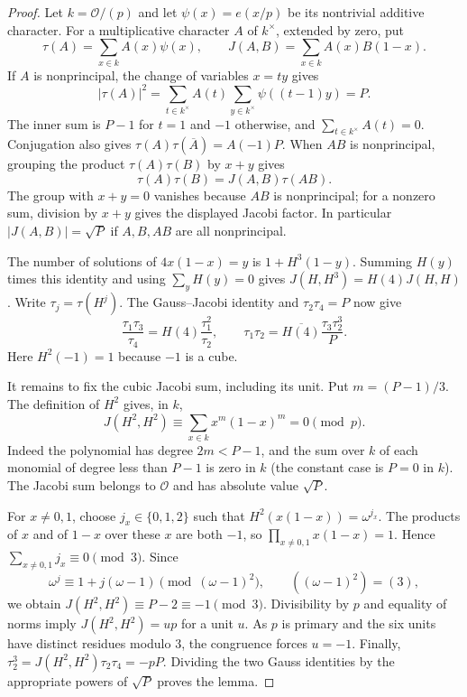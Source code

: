 \documentclass[11pt,a4paper]{article}
\numberwithin{equation}{section}
\numberwithin{figure}{section}
\theoremstyle{definition}
\theoremstyle{remark}
\begin{document}
\begin{proof}
Let $k=\mathcal O/(p)$ and let $\psi(x)=e(x/p)$ be its nontrivial additive
character.  For a multiplicative character $A$ of $k^\times$, extended by
zero, put
\[
 \tau(A)=\sum_{x\in k}A(x)\psi(x),\qquad
 J(A,B)=\sum_{x\in k}A(x)B(1-x).
\]
If $A$ is nonprincipal, the change of variables $x=ty$ gives
\[
 |\tau(A)|^2
 =\sum_{t\in k^\times}A(t)\sum_{y\in k^\times}\psi((t-1)y)=P.
\]
The inner sum is $P-1$ for $t=1$ and $-1$ otherwise, and
$\sum_{t\in k^\times}A(t)=0$.  Conjugation also gives
$\tau(A)\tau(\overline A)=A(-1)P$.  When $AB$ is nonprincipal, grouping
the product $\tau(A)\tau(B)$ by $x+y$ gives
\[
 \tau(A)\tau(B)=J(A,B)\tau(AB).
\]
The group with $x+y=0$ vanishes because $AB$ is nonprincipal; for a nonzero
sum, division by $x+y$ gives the displayed Jacobi factor.  In particular
$|J(A,B)|=\sqrt P$ if $A,B,AB$ are all nonprincipal.

The number of solutions of $4x(1-x)=y$ is $1+H^3(1-y)$.  Summing $H(y)$
times this identity and using $\sum_yH(y)=0$ gives
$J(H,H^3)=H(4)J(H,H)$.  Write $\tau_j=\tau(H^j)$.
The Gauss--Jacobi identity and $\tau_2\tau_4=P$ now give
\[
 \frac{\tau_1\tau_3}{\tau_4}
   =H(4)\frac{\tau_1^2}{\tau_2},\qquad
 \tau_1\tau_2=\overline{H(4)}\frac{\tau_3\tau_2^3}{P}.
\]
Here $H^2(-1)=1$ because $-1$ is a cube.

It remains to fix the cubic Jacobi sum, including its unit.  Put
$m=(P-1)/3$.  The definition of $H^2$ gives, in $k$,
\[
 J(H^2,H^2)\equiv\sum_{x\in k}x^m(1-x)^m=0\pmod p.
\]
Indeed the polynomial has degree $2m<P-1$, and the sum over $k$ of each
monomial of degree less than $P-1$ is zero in $k$ (the constant case is
$P=0$ in $k$).  The Jacobi sum belongs to $\mathcal O$ and has absolute
value $\sqrt P$.

For $x\ne0,1$, choose $j_x\in\{0,1,2\}$ such that
$H^2(x(1-x))=\omega^{j_x}$.  The products of $x$ and of $1-x$ over these
$x$ are both $-1$, so $\prod_{x\ne0,1}x(1-x)=1$.  Hence
$\sum_{x\ne0,1}j_x\equiv0\pmod3$.  Since
\[
 \omega^j\equiv1+j(\omega-1)\pmod{(\omega-1)^2},
 \qquad ((\omega-1)^2)=(3),
\]
we obtain $J(H^2,H^2)\equiv P-2\equiv-1\pmod3$.  Divisibility by $p$
and equality of norms imply $J(H^2,H^2)=up$ for a unit $u$.  As $p$ is
primary and the six units have distinct residues modulo $3$, the congruence
forces $u=-1$.  Finally,
$\tau_2^3=J(H^2,H^2)\tau_2\tau_4=-pP$.  Dividing the two Gauss identities
by the appropriate powers of $\sqrt P$ proves the lemma.
\end{proof}
\end{document}
